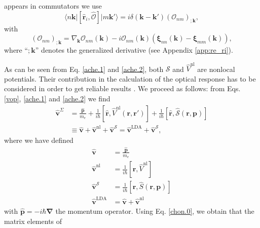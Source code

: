appears in commutators we use \cite{aversaPRB95}
\begin{equation}\label{conmri3n}
\langle n\mathbf{k}\vert
\left[
\hat{\mathbf{r}}_{i}, \hat{\mathcal{O}}
\right]
\vert m\mathbf{k}'\rangle
= i\delta(\mathbf{k} - \mathbf{k}')(\mathcal{O}_{nm})_{;\mathbf{k}},
\end{equation}  
with
\begin{equation}\label{gendevnn}
(\mathcal{O}_{nm})_{;\mathbf{k}} =
  \nabla_{\mathbf{k}}\mathcal{O}_{nm}(\mathbf{k})
- i\mathcal{O}_{nm}(\mathbf{k})
\left(
\boldsymbol{\xi}_{nn}(\mathbf{k}) - \boldsymbol{\xi}_{mm}(\mathbf{k})
\right),
\end{equation} 
where ``$;\mathbf{k}$'' denotes the generalized derivative (see Appendix
\ref{app:re_ri}).

As can be seen from Eq. \eqref{ache.1} and \eqref{ache.2}, both $\mathcal{S}$
and $\hat{V}^{\mathrm{nl}}$ are nonlocal potentials. Their contribution in the
calculation of the optical response has to be considered in order to get
reliable results \cite{ismailPRL01}. We proceed as follows: from Eqs.
\eqref{vop}, \eqref{ache.1} and \eqref{ache.2} we find
\begin{align}\label{vop2}
\hat{\mathbf{v}}^{\Sigma} &=
\frac{\hat{\mathbf{p}}}{m_{e}} + \frac{1}{i\hbar}
\left[\hat{\mathbf{r}},\hat{V}^{\mathrm{nl}}(\mathbf{r},\mathbf{r}')\right]
+ \frac{1}{i\hbar}
  \left[\hat{\mathbf{r}},\hat{\mathcal{S}}(\mathbf{r},\mathbf{p})\right]
\nonumber\\
&\equiv
  \hat{\mathbf{v}} + \hat{\mathbf{v}}^{\mathrm{nl}} 
+ \hat{\mathbf{v}}^{\mathcal{S}}
= \hat{\mathbf{v}}^\mathrm{LDA} + \hat{\mathbf{v}}^{\mathcal{S}},
\end{align}
where we have defined
\begin{equation}\label{conhr}
\begin{split}
\hat{\mathbf{v}} &=\frac{\hat{\mathbf{p}}}{m_{e}}\\
\hat{\mathbf{v}}^{\mathrm{nl}} &= \frac{1}{i\hbar}
  \left[\hat{\mathbf{r}},\hat{V}^{\mathrm{nl}}\right]\\
\hat{\mathbf{v}}^{\mathcal{S}} &= \frac{1}{i\hbar}
  \left[\hat{\mathbf{r}},\hat{S}(\mathbf{r},\mathbf{p})\right]\\
\hat{\mathbf{v}}^\mathrm{LDA} &= \hat{\mathbf{v}}+\hat{\mathbf{v}}^{\mathrm{nl}}
\end{split}
\end{equation}  
with $\hat{\mathbf{p}}= -i\hbar\boldsymbol{\nabla}$ the momentum operator. Using
Eq. \eqref{chon.0}, we obtain that the matrix elements of
